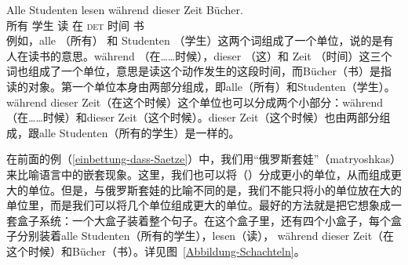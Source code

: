 \ea
\label{Beispiel-Alle-Studenten-lesen}
\gll Alle Studenten lesen während dieser Zeit Bücher.\\
     所有  学生  读  在  \textsc{det}   时间 书\\
\z
例如，alle （所有） 和 Studenten （学生）这两个词组成了一个单位，说的是有人在读书的意思。während （在……时候），dieser （这）和 Zeit （时间）这三个词也组成了一个单位，意思是读这个动作发生的这段时间，而Bücher（书）是指读的对象。第一个单位本身由两部分组成，即alle（所有）和Studenten（学生）。während dieser Zeit（在这个时候）这个单位也可以分成两个小部分：während（在……时候）和dieser Zeit（这个时候）。dieser Zeit（这个时候）也由两部分组成，跟alle Studenten（所有的学生）是一样的。

在前面的例（\ref{einbettung-dass-Saetze}）中，我们用“俄罗斯套娃”（matryoshkas）来比喻语言中的嵌套现象。这里，我们也可以将（）分成更小的单位，从而组成更大的单位。但是，与俄罗斯套娃的比喻不同的是，我们不能只将小的单位放在大的单位里，而是我们可以将几个单位组成更大的单位。最好的方法就是把它想象成一套盒子系统：一个大盒子装着整个句子。在这个盒子里，还有四个小盒子，每个盒子分别装着alle Studenten（所有的学生），lesen（读）， während dieser Zeit（在这个时候）和Bücher（书）。详见图~\vref{Abbildung-Schachteln}。

